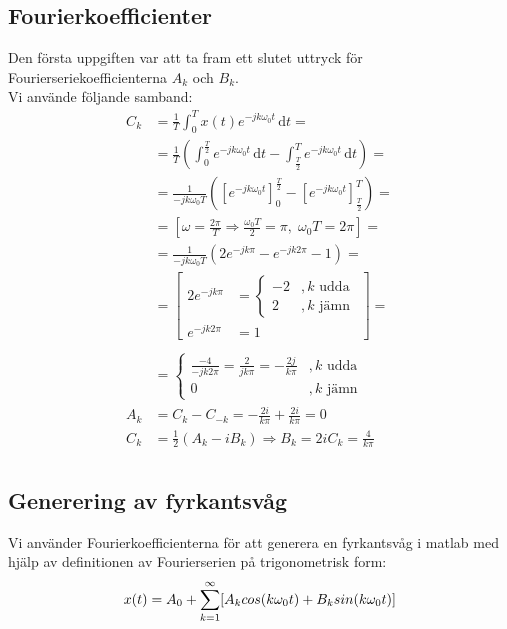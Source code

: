 \documentclass[]{article}
\begin{document}
\subsection{Fourierkoefficienter} %
\label{sub:fourierkoefficienter}
Den första uppgiften var att ta fram ett slutet uttryck för Fourierseriekoefficienterna $A_k$ och $B_k$.\\
Vi använde följande samband:\\
\begin{align*}
	C_k &= \frac{1}{T} \int_0^T \! x(t) e^{-jk\omega_0 t}\, \mathrm{d} t =\\
			&= \frac{1}{T} \left(
						\int_0^{\frac{T}{2}} \! e^{-jk\omega_0 t}\, \mathrm{d} t
						- \int_{\frac{T}{2}}^T \! e^{-jk\omega_0 t}\, \mathrm{d} t \right) =\\
			&= \frac{1}{-jk\omega_0 T} \left(
						\left[e^{-jk\omega_0 t}\right]_0^{\frac{T}{2}}
						- \left[e^{-jk\omega_0 t}\right]_{\frac{T}{2}}^T
					\right) = \\
			&= \left[
					\omega = \frac{2\pi}{T} \Rightarrow \frac{\omega_0 T}{2} = \pi ,\;	\omega_0 T = 2\pi
				\right] = \\
			&= \frac{1}{-jk\omega_0 T} \left(
					2e^{-jk\pi} - e^{-jk2\pi} - 1
				\right) = \\
			&=	\left[
					\begin{array}{ll}
						2e^{-jk\pi} &=
							\left\{
								\begin{array}{ll}
									-2	& ,k\text{ udda} \\
									2 & ,k\text{ jämn} 
								\end{array}
							\right. \\
						e^{-jk2\pi} &= 1
					\end{array}
					\right] = \\ \\
			&= \left\{ \begin{array}{ll}
						\frac{-4}{-jk2\pi} = \frac{2}{jk\pi} = -\frac{2j}{k\pi}&,k\text{ udda} \\
						0 &,k\text{ jämn}
					\end{array} \right.\\
	A_k &= C_k - C_{-k} = -\frac{2i}{k\pi} + \frac{2i}{k\pi} = 0\\
	C_k &= \frac{1}{2}(A_k - iB_k) \Rightarrow B_k = 2iC_k = \frac{4}{k\pi}\\
\end{align*}

\subsection{Generering av fyrkantsvåg} %
Vi använder Fourierkoefficienterna för att generera en fyrkantsvåg i matlab med hjälp av definitionen av Fourierserien på trigonometrisk form: 
\[
	x(t) = A_0 + \sum\limits_{k=1}^\infty [A_k cos(k\omega_0 t) + B_k sin(k\omega_0 t)] \\
\]
\end{document}
